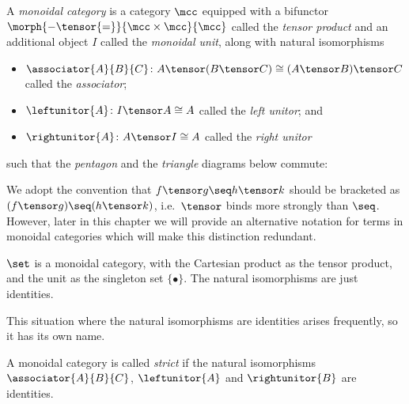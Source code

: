 \begin{definition}
    A \emph{monoidal category} is a category \(\mcc\) equipped with a
    bifunctor \(\morph{{-} \tensor {=}}{\mcc \times \mcc}{\mcc}\) called the
    \emph{tensor product} and an additional object \(I\) called the
    \emph{monoidal unit},
    along with natural isomorphisms
    \begin{itemize}
        \item \(
            \associator{A}{B}{C}
            \colon
            A \tensor (B \tensor C)
            \cong
            (A \tensor B) \tensor C
            \) called the \emph{associator};
        \item \(
            \leftunitor{A}
            \colon
            I \tensor A
            \cong
            A
            \) called the \emph{left unitor}; and
        \item \(
            \rightunitor{A}
            \colon
            A \tensor I
            \cong
            A
            \) called the \emph{right unitor}
    \end{itemize}
    such that the \emph{pentagon} and the \emph{triangle} diagrams below
    commute:
    \begin{center}
        

        \vspace{1em}

        
    \end{center}
\end{definition}

We adopt the convention that \(f \tensor g \seq h \tensor k\) should be
bracketed as \((f \tensor g) \seq (h \tensor k)\), i.e.\ \(\tensor\) binds
more strongly than \(\seq\).
However, later in this chapter we will provide an alternative notation for terms
in monoidal categories which will make this distinction redundant.

\begin{example}
    \(\set\) is a monoidal category, with the Cartesian product as the tensor
    product, and the unit as the singleton set \(\{\bullet\}\).
    The natural isomorphisms are just identities.
\end{example}

This situation where the natural isomorphisms are identities arises frequently,
so it has its own name.

\begin{definition}
    A monoidal category is called \emph{strict} if the natural isomorphisms \(
        \associator{A}{B}{C}
    \), \(
        \leftunitor{A}
    \) and \(
        \rightunitor{B}
    \) are identities.
\end{definition}

